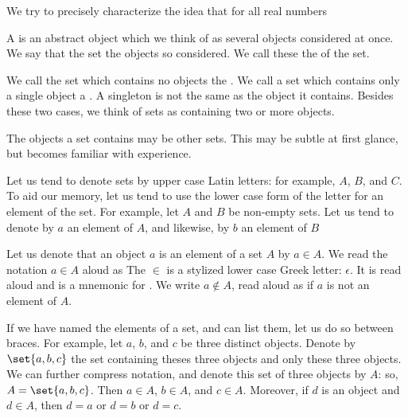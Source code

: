 \sbasic


\sstart



We try to precisely
characterize the idea
that for all real
numbers


A  is an abstract
object which we think of as
several objects considered
at once.
We say that the set
the objects so considered.
We call these
the
 of the set.

We call the set which contains
no objects the
.
We call
a set which contains
only a single object a
.
A singleton is not the
same as the object
it contains.
Besides these two cases,
we think of sets
as containing
two or more objects.

The objects a set contains
may be other sets.
This may be subtle at
first glance, but becomes
familiar with experience.


Let us tend to
denote sets by
upper case Latin letters:
for example,
$A$, $B$, and $C$.
To aid our memory,
let us tend to use the lower
case form of the letter for
an element of the set.
For example,
let $A$ and $B$ be
non-empty sets.
Let us tend to denote by
$a$ an element of $A$,
and likewise,
by $b$ an element of $B$

Let us denote that
an object $a$
is an element of a set $A$
by $a \in A$.
We read the notation
$a \in A$ aloud as 
The $\in$ is a stylized
lower case Greek letter: $\epsilon$.
It is
read aloud  and
is a mnemonic for .
We write $a \not\in A$, read aloud
as  if $a$ is not
an element of $A$.

If we have named
the elements of a set,
and can list them,
let us do so between braces.
For example,
let $a$, $b$, and $c$
be three distinct objects.
Denote by $\set{a, b, c}$
the set containing theses
three objects and only these
three objects.
We can further compress notation,
and denote this set of
three objects by $A$:
so, $A = \set{a, b, c}$.
Then $a \in A$,
$b \in A$, and $c \in A$.
Moreover, if $d$
is an object and
$d \in A$, then $d = a$
or $d = b$ or $d = c$.

